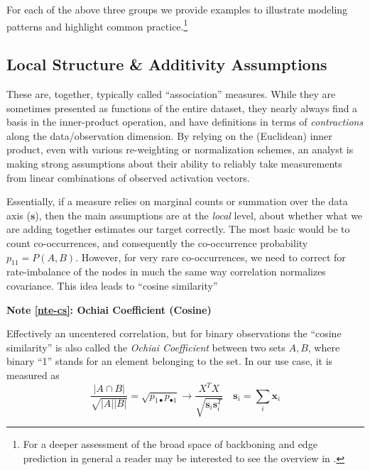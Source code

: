 \documentclass[%
	12pt,
		oneside,
		letterpaper
]{book}
\newcounter{quartocalloutnteno}
\newcommand{\quartocalloutnte}[1]{\refstepcounter{quartocalloutnteno}\label{#1}}
\begin{document}
For each of the above three groups we provide examples to illustrate modeling patterns and highlight common practice.\footnote{
  For a deeper assessment of the broad space of backboning and edge prediction in general a reader may be interested to see the overview in \textcite{atlasaspiringnetwork_Coscia2021}.}

\subsection{Local Structure \& Additivity Assumptions}\label{local-structure-additivity-assumptions}

These are, together, typically called ``association'' measures.
While they are sometimes presented as functions of the entire dataset, they nearly always find a basis in the inner-product operation, and have definitions in terms of \emph{contractions} along the data/observation dimension.
By relying on the (Euclidean) inner product, even with various re-weighting or normalization schemes, an analyst is making strong assumptions about their ability to reliably take measurements from linear combinations of observed activation vectors.

Essentially, if a measure relies on marginal counts or summation over the data axis (\(\mathbf{s}\)), then the main assumptions are at the \emph{local} level, about whether what we are adding together estimates our target correctly.
The most basic would be to count co-occurrences, and consequently the co-occurrence probability \(p_{11}=P(A,B)\).
However, for very rare co-occurrences, we need to correct for rate-imbalance of the nodes in much the same way correlation normalizes covariance.
This idea leads to ``cosine similarity''

\begin{tcolorbox}[enhanced jigsaw, bottomrule=.15mm, colback=white, breakable, toprule=.15mm, colframe=quarto-callout-note-color-frame, leftrule=.75mm, arc=.35mm, opacityback=0, rightrule=.15mm, left=2mm]

\quartocalloutnte{nte-cs} 

\vspace{-3mm}\textbf{Note \ref*{nte-cs}: Ochiai Coefficient (Cosine)}\vspace{3mm}

Effectively an uncentered correlation, but for binary observations the ``cosine similarity'' is also called the \emph{Ochiai Coefficient} between two sets \(A,B\), where binary ``1'' stands for an element belonging to the set.\autocite{Measuresecologicalassociation_Janson1981}
In our use case, it is measured as
\[
\frac{|A \cap B |}{\sqrt{|A||B|}}=\sqrt{p_{1\bullet}p_{\bullet 1}} \rightarrow  \frac{X^TX}{\sqrt{\mathbf{s}_i\mathbf{s}_i^T}}\quad \mathbf{s}_i = \sum_i \mathbf{x}_i
\]

\end{tcolorbox}
\end{document}
